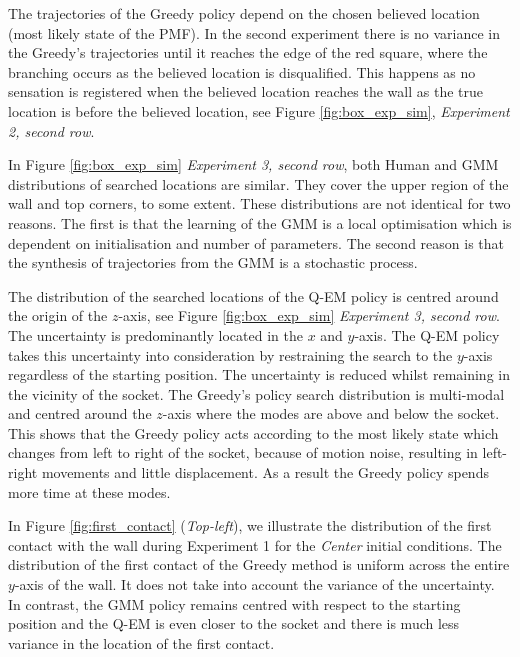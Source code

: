 The trajectories of the Greedy policy depend on the chosen believed location (most likely state of the PMF). In the 
second experiment there is no variance in the Greedy's trajectories until it reaches the edge of the red square, 
where the branching occurs as the believed location is disqualified. This happens as  
no sensation is registered when the believed location reaches the wall as the true location is before the believed location, see 
Figure \ref{fig:box_exp_sim}, \textit{Experiment 2, second row}.

In Figure \ref{fig:box_exp_sim} \textit{Experiment 3, second row}, both Human and GMM distributions of
searched locations are similar. They cover the upper region of the wall and top corners, to 
some extent. These distributions are not identical for two reasons. The first is that the learning of the GMM is a 
local optimisation which is dependent on initialisation and number of parameters. The second reason is that 
the synthesis of trajectories from the GMM is a stochastic process. 

The distribution of the searched locations of the Q-EM policy is centred around the origin of the $z$-axis,
see Figure \ref{fig:box_exp_sim}  \textit{Experiment 3, second row}. 
The uncertainty is predominantly located in the $x$ and $y$-axis. The Q-EM policy takes this uncertainty 
into consideration by restraining the search to the $y$-axis regardless of the starting position. The uncertainty 
is reduced whilst remaining in the vicinity of the socket. 
The Greedy's policy search distribution is multi-modal and centred around the $z$-axis where the modes are above 
and below the socket. This shows that the Greedy policy acts according to the most likely state 
which changes from left to right of the socket, because of motion noise, resulting in left-right 
movements and little displacement. As a result the Greedy policy spends more time at these modes.

In Figure \ref{fig:first_contact} (\textit{Top-left}), we illustrate the distribution of the first contact with the wall 
during Experiment 1 for the \textit{Center} initial conditions. The distribution of the first contact of the Greedy method is uniform across 
the entire $y$-axis of the wall. 
It does not take into account the variance of the uncertainty. In contrast, the GMM policy remains centred with respect to the starting position and the Q-EM is even closer to the socket and 
there is much less variance in the location of the first contact.

